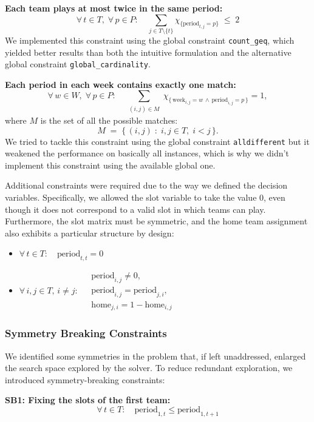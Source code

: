 \textbf{Each team plays at most twice in the same period:}
\[
\forall\, t \in T,\; \forall\, p \in P:\quad 
\sum_{j \in T \setminus \{t\}} \chi_{\{\text{period}_{t,j} = p\}} \;\leq\; 2
\]
We implemented this constraint using the global constraint \texttt{count\_geq}, which yielded better results than both the intuitive formulation and the alternative global constraint \texttt{global\_cardinality}.

\textbf{Each period in each week contains exactly one match:}
\[
\forall\, w \in W,\;
\forall\, p \in P:\quad
\sum_{\substack{(i,j) \in M}}
\chi_{\{\,\text{week}_{i,j} = w \,\wedge\, \text{period}_{i,j} = p\,\}} = 1,
\]
where $M$ is the set of all the possible matches: \[
M \;=\; \bigl\{\,(i,j) \;:\; i,j \in T,\; i<j \,\bigr\}.
\]
We tried to tackle this constraint using the global constraint \texttt{alldifferent} but it weakened the performance on basically all instances, which is why we didn't implement this constraint using the available global one.

Additional constraints were required due to the way we defined the decision variables. Specifically, we allowed the slot variable to take the value $0$, even though it does not correspond to a valid slot in which teams can play. Furthermore, the slot matrix must be symmetric, and the home team assignment also exhibits a particular structure by design:
\begin{itemize}
    \item $\forall\, t \in T:\quad \text{period}_{t,t} = 0$
    \item  $\forall\, i,j \in T,\, i \ne j:\;
\begin{aligned}
& \text{period}_{i,j} \ne 0,\\
& \text{period}_{i,j} = \text{period}_{j,i},\\
& \text{home}_{j,i} = 1 - \text{home}_{i,j}
\end{aligned}$
\end{itemize}

\subsubsection*{Symmetry Breaking Constraints}
We identified some symmetries in the problem that, if left unaddressed,  enlarged the search space explored by the solver. To reduce redundant exploration, we introduced symmetry-breaking constraints:

\textbf{SB1: Fixing the slots of the first team:}
\[
\forall\, t \in T:\quad \text{period}_{1,t} \le \text{period}_{1,t+1}
\]

